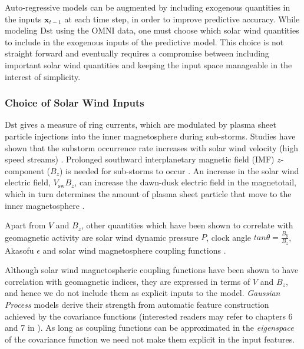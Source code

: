 Auto-regressive models can be augmented by including exogenous quantities in the inputs $ \mathbf{x}_{t-1}$ at each time step, in order to improve predictive accuracy. While modeling $\mathrm{Dst}$ using the OMNI data, one must choose which solar wind quantities to include in the exogenous inputs of the predictive model. This choice is not straight forward and eventually requires a compromise between including important solar wind quantities and keeping the input space manageable in the interest of simplicity.

\subsubsection{Choice of Solar Wind Inputs}

$ \mathrm{Dst}$ gives a measure of ring currents, which are modulated by plasma sheet particle injections into the inner magnetosphere during sub-storms. Studies have shown that the substorm occurrence rate increases with solar wind velocity (high speed streams) \citet{Kissinger2011,Newell2016}. Prolonged southward interplanetary magnetic field (IMF) $z$-component ($B_z$) is needed for sub-storms to occur \citep{McPherron1986}. An increase in the solar wind electric field, $V_{\text{sw}}B_z$, can increase the dawn-dusk electric field in the magnetotail, which in turn determines the amount of plasma sheet particle that move to the inner magnetosphere \citet{Friedel2001}. 

Apart from $V$ and $B_z$, other quantities which have been shown to correlate with geomagnetic activity are solar wind dynamic pressure $P$, clock angle $tan \theta = \frac{B_y}{B_z}$, Akasofu $\epsilon$ \citep{1986AkasofuE} and solar wind magnetosphere coupling functions \citep{JGRA:JGRA21451}. 

Although solar wind magnetospheric coupling functions have been shown to have correlation with geomagnetic indices, they are expressed in terms of $V$ and $B_z$, and hence we do not include them as explicit inputs to the model. \emph{Gaussian Process} models derive their strength from automatic feature construction achieved by the covariance functions (interested readers may refer to chapters 6 and 7  in \citet{Rasmussen:2005:GPM:1162254}). As long as coupling functions can be approximated in the \emph{eigenspace} of the covariance function we need not make them explicit in the input features. 

